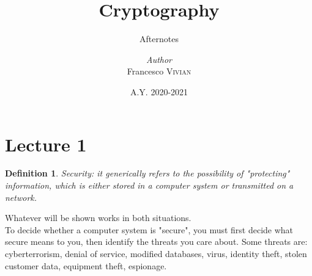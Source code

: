 \documentclass[a4paper, 12pt]{report}
\institute{Ca' Foscari University}
\title{Cryptography}
\subtitle{Afternotes}
\author{\textit{Author}\\Francesco \textsc{Vivian}}
\date{A.Y. 2020-2021}
\newtheorem{definition}{\textbf{Definition}}
\begin{document}
    \maketitle
\chapter*{Lecture 1}
\begin{definition}
	Security: it generically refers to the possibility of "protecting" information, which is either stored in a computer system or transmitted on a network.
\end{definition}
Whatever will be shown works in both situations.\\
To decide whether a computer system is "secure", you must first decide what secure means to you, then identify the threats you care about. Some threats are: cyberterrorism, denial of service, modified databases, virus, identity theft, stolen customer data, equipment theft, espionage.
\end{document}
